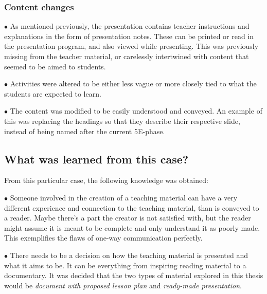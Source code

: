 \subsubsection*{Content changes}
\begin{description}
    \item $\bullet$ As mentioned previously, the presentation contains teacher instructions and explanations in the form of presentation notes. These can be printed or read in the presentation program, and also viewed while presenting. This was previously missing from the teacher material, or carelessly intertwined with content that seemed to be aimed to students.
    \item $\bullet$ Activities were altered to be either less vague or more closely tied to what the students are expected to learn.
    \item $\bullet$ The content was modified to be easily understood and conveyed. An example of this was replacing the headings so that they describe their respective slide, instead of being named after the current 5E-phase.
\end{description}
\subsection{What was learned from this case?}
From this particular case, the following knowledge was obtained:
\begin{description}
    \item $\bullet$ Someone involved in the creation of a teaching material can have a very different experience and connection to the teaching material, than is conveyed to a reader. Maybe there's a part the creator is not satisfied with, but the reader might assume it is meant to be complete and only understand it as poorly made. This exemplifies the flaws of one-way communication perfectly.
    \item $\bullet$ There needs to be a decision on how the teaching material is presented and what it aims to be. It can be everything from inspiring reading material to a documentary. It was decided that the two types of material explored in this thesis would be \textit{document with proposed lesson plan} and \textit{ready-made presentation}.
\end{description}

